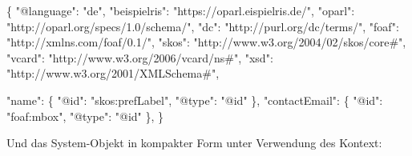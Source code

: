 \documentclass[,a4paper]{article}
\newenvironment{Shaded}{}{}
\newcommand{\DataTypeTok}[1]{\textcolor[rgb]{0.56,0.13,0.00}{{#1}}}
\newcommand{\StringTok}[1]{\textcolor[rgb]{0.25,0.44,0.63}{{#1}}}
\newcommand{\FunctionTok}[1]{\textcolor[rgb]{0.02,0.16,0.49}{{#1}}}
\begin{document}
\begin{Shaded}
\begin{Highlighting}[]
\FunctionTok{\{}
    \DataTypeTok{"@language"}\FunctionTok{:} \StringTok{"de"}\FunctionTok{,}
    \DataTypeTok{"beispielris"}\FunctionTok{:} \StringTok{"https://oparl.eispielris.de/"}\FunctionTok{,}
    \DataTypeTok{"oparl"}\FunctionTok{:} \StringTok{"http://oparl.org/specs/1.0/schema/"}\FunctionTok{,}
    \DataTypeTok{"dc"}\FunctionTok{:} \StringTok{"http://purl.org/dc/terms/"}\FunctionTok{,}
    \DataTypeTok{"foaf"}\FunctionTok{:} \StringTok{"http://xmlns.com/foaf/0.1/"}\FunctionTok{,}
    \DataTypeTok{"skos"}\FunctionTok{:} \StringTok{"http://www.w3.org/2004/02/skos/core#"}\FunctionTok{,}
    \DataTypeTok{"vcard"}\FunctionTok{:} \StringTok{"http://www.w3.org/2006/vcard/ns#"}\FunctionTok{,}
    \DataTypeTok{"xsd"}\FunctionTok{:} \StringTok{"http://www.w3.org/2001/XMLSchema#"}\FunctionTok{,}

    \DataTypeTok{"name"}\FunctionTok{:} \FunctionTok{\{}
        \DataTypeTok{"@id"}\FunctionTok{:} \StringTok{"skos:prefLabel"}\FunctionTok{,}
        \DataTypeTok{"@type"}\FunctionTok{:} \StringTok{"@id"}
    \FunctionTok{\},}
    \DataTypeTok{"contactEmail"}\FunctionTok{:} \FunctionTok{\{}
        \DataTypeTok{"@id"}\FunctionTok{:} \StringTok{"foaf:mbox"}\FunctionTok{,}
        \DataTypeTok{"@type"}\FunctionTok{:} \StringTok{"@id"}
    \FunctionTok{\},}
\FunctionTok{\}}
\end{Highlighting}
\end{Shaded}

Und das System-Objekt in kompakter Form unter Verwendung des Kontext:
\end{document}
